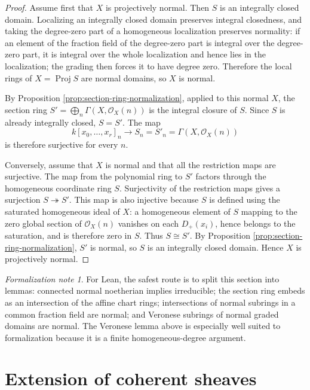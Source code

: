\documentclass[11pt]{amsart}
\DeclareMathOperator{\Proj}{Proj}
\newcommand{\OO}{\mathcal O}
\newcommand{\onto}{\twoheadrightarrow}
\theoremstyle{plain}
\theoremstyle{definition}
\theoremstyle{remark}
\newtheorem*{formalization}{Formalization note}
\begin{document}
\begin{proof}
Assume first that $X$ is projectively normal.  Then $S$ is an integrally closed domain.  Localizing an integrally closed domain preserves integral closedness, and taking the degree-zero part of a homogeneous localization preserves normality: if an element of the fraction field of the degree-zero part is integral over the degree-zero part, it is integral over the whole localization and hence lies in the localization; the grading then forces it to have degree zero.  Therefore the local rings of $X=\Proj S$ are normal domains, so $X$ is normal.

By Proposition \ref{prop:section-ring-normalization}, applied to this normal $X$, the section ring $S'=\bigoplus_n\Gamma(X,\OO_X(n))$ is the integral closure of $S$.  Since $S$ is already integrally closed, $S=S'$.  The map
\[
  k[x_0,\ldots,x_r]_n \longrightarrow S_n = S'_n = \Gamma(X,\OO_X(n))
\]
is therefore surjective for every $n$.

Conversely, assume that $X$ is normal and that all the restriction maps are surjective.  The map from the polynomial ring to $S'$ factors through the homogeneous coordinate ring $S$.  Surjectivity of the restriction maps gives a surjection $S\onto S'$.  This map is also injective because $S$ is defined using the saturated homogeneous ideal of $X$: a homogeneous element of $S$ mapping to the zero global section of $\OO_X(n)$ vanishes on each $D_+(x_i)$, hence belongs to the saturation, and is therefore zero in $S$.  Thus $S\cong S'$.  By Proposition \ref{prop:section-ring-normalization}, $S'$ is normal, so $S$ is an integrally closed domain.  Hence $X$ is projectively normal.
\end{proof}

\begin{formalization}
For Lean, the safest route is to split this section into lemmas: connected normal noetherian implies irreducible; the section ring embeds as an intersection of the affine chart rings; intersections of normal subrings in a common fraction field are normal; and Veronese subrings of normal graded domains are normal.  The Veronese lemma above is especially well suited to formalization because it is a finite homogeneous-degree argument.
\end{formalization}

\section{Extension of coherent sheaves}
\end{document}
